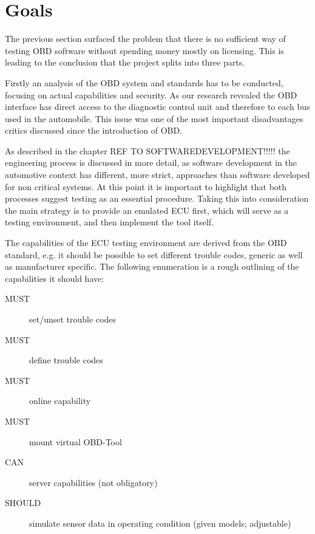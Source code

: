 
\chapter{Goals}

The previous section surfaced the problem that there is no sufficient
way of testing OBD software without spending money mostly on
licensing. This is leading to the conclusion that the project splits
into three parts.

Firstly an analysis of the OBD system and standards has to be
conducted, focusing on actual capabilities and security. As our
research revealed the OBD interface has direct access to the
diagnostic control unit and therefore to each bus used in the
automobile. This issue was one of the most important disadvantages
critics discussed since the introduction of
OBD.

As described in the chapter REF TO SOFTWAREDEVELOPMENT!!!!! the engineering process is discussed in more detail, as
software development in the automotive context has different, more
strict, approaches than software developed for non critical systems.
At this point it is important to highlight that both processes suggest
testing as an essential procedure. Taking this into
consideration the main strategy is to provide an emulated ECU first,
which will serve as a testing environment, and then implement the tool
itself.

The capabilities of the ECU testing environment are derived from the
OBD standard, e.g. it should be possible to set different trouble codes,
generic as well as manufacturer specific. The following enumeration is
a rough outlining of the capabilities it should have:

\begin{description}
\item[MUST] set/unset trouble codes
\item[MUST] define trouble codes
\item[MUST] online capability
\item[MUST] mount virtual OBD-Tool
\item[CAN] server capabilities (not obligatory)
\item[SHOULD] simulate sensor data in operating condition (given models;
  adjustable)
\end{description}

